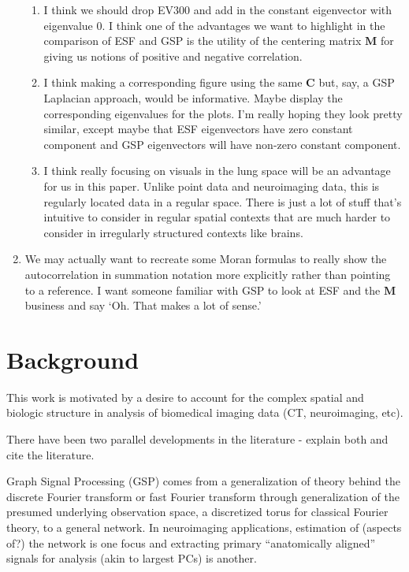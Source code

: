 \documentclass[12pt]{article}
\begin{document}
\begin{enumerate}[$\bullet$]
\begin{enumerate}
		\item I think we should drop EV300 and add in the constant eigenvector with eigenvalue 0. I think one of the advantages we want to highlight in the comparison of ESF and GSP is the utility of the centering matrix $\mathbf M$ for giving us notions of positive and negative correlation.
		\item I think making a corresponding figure using the same $\mathbf C$ but, say, a GSP Laplacian approach, would be informative. Maybe display the corresponding eigenvalues for the plots. I'm really hoping they look pretty similar, except maybe that ESF eigenvectors have zero constant component and GSP eigenvectors will have non-zero constant component.
		\item I think really focusing on visuals in the lung space will be an advantage for us in this paper. Unlike point data and neuroimaging data, this is regularly located data in a regular space. There is just a lot of stuff that's intuitive to consider in regular spatial contexts that are much harder to consider in irregularly structured contexts like brains.
	\end{enumerate}
	\item We may actually want to recreate some Moran formulas to really show the autocorrelation in summation notation more explicitly rather than pointing to a reference. I want someone familiar with GSP to look at ESF and the $\mathbf M$ business and say `Oh. That makes a lot of sense.'
\end{enumerate}


\section{Background}

This work is motivated by a desire to account for the complex spatial and biologic structure in analysis of biomedical imaging data (CT, neuroimaging, etc).

There have been two parallel developments in the literature - explain both and cite the literature.

Graph Signal Processing (GSP) comes from a generalization of theory behind the discrete Fourier transform or fast Fourier transform through generalization of the presumed underlying observation space, a discretized torus for classical Fourier theory, to a general network. In neuroimaging applications, estimation of (aspects of?) the network is one focus and extracting primary ``anatomically aligned'' signals for analysis (akin to largest PCs) is another. 
\end{document}
